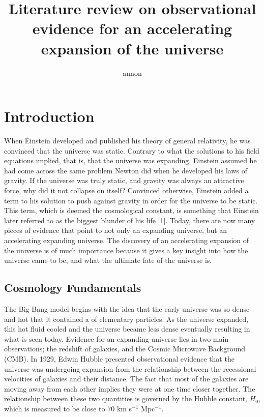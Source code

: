 \documentclass[12pt]{article}
\begin{document}
	\title{Literature review on observational evidence for an accelerating expansion of the universe} 
  \author{annon}
	
	\maketitle
	\thispagestyle{empty}
	\newpage
	\tableofcontents
	\newpage
	
	
	\section{Introduction}
When Einstein developed and published his theory of general relativity, he was convinced that the universe was static. Contrary to what the solutions to his field equations implied, that is, that the universe was expanding, Einstein assumed he had come across the same problem Newton did when he developed his laws of gravity. If the universe was truly static, and gravity was always an attractive force, why did it not collapse on itself? Convinced otherwise, Einstein added a term to his solution to push against gravity in order for the universe to be static. This term, which is deemed the cosmological constant, is something that Einstein later referred to as the biggest blunder of his life [1]. Today, there are now many pieces of evidence that point to not only an expanding universe, but an accelerating expanding universe. The discovery of an accelerating expansion of the universe is of much importance because it gives a key insight into how the universe came to be, and what the ultimate fate of the universe is.
	\\ 
	

 
	\subsection{Cosmology Fundamentals}
	
The Big Bang model begins with the idea that the early universe was so dense and hot that it contained a  of elementary particles. As the universe expanded, this hot fluid cooled and the universe became less dense eventually resulting in what is seen today. Evidence for an expanding universe lies in two main observations; the redshift of galaxies, and the Cosmic Microwave Background (CMB).
In 1929, Edwin Hubble presented observational evidence that the universe was undergoing expansion from the relationship between the recessional velocities of galaxies and their distance. The fact that most of the galaxies are moving away from each other implies they were at one time closer together. The relationship between these two quantities is governed by the Hubble constant, $H_0$, which is measured to be close to 70 km s$^{-1}$ Mpc$^{-1}$.
\end{document}
